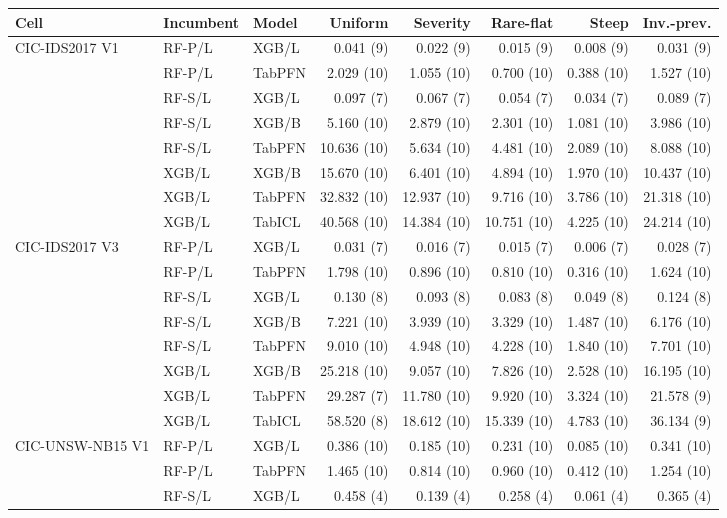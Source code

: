 \begin{tabular}{@{}lllrrrrr@{}}
\toprule
Cell & Incumbent & Model & Uniform & Severity & Rare-flat & Steep & Inv.-prev. \\
\midrule
CIC-IDS2017 V1 & RF-P/L & XGB/L & 0.041 (9) & 0.022 (9) & 0.015 (9) & 0.008 (9) & 0.031 (9) \\
 & RF-P/L & TabPFN & 2.029 (10) & 1.055 (10) & 0.700 (10) & 0.388 (10) & 1.527 (10) \\
 & RF-S/L & XGB/L & 0.097 (7) & 0.067 (7) & 0.054 (7) & 0.034 (7) & 0.089 (7) \\
 & RF-S/L & XGB/B & 5.160 (10) & 2.879 (10) & 2.301 (10) & 1.081 (10) & 3.986 (10) \\
 & RF-S/L & TabPFN & 10.636 (10) & 5.634 (10) & 4.481 (10) & 2.089 (10) & 8.088 (10) \\
 & XGB/L & XGB/B & 15.670 (10) & 6.401 (10) & 4.894 (10) & 1.970 (10) & 10.437 (10) \\
 & XGB/L & TabPFN & 32.832 (10) & 12.937 (10) & 9.716 (10) & 3.786 (10) & 21.318 (10) \\
 & XGB/L & TabICL & 40.568 (10) & 14.384 (10) & 10.751 (10) & 4.225 (10) & 24.214 (10) \\
\addlinespace
CIC-IDS2017 V3 & RF-P/L & XGB/L & 0.031 (7) & 0.016 (7) & 0.015 (7) & 0.006 (7) & 0.028 (7) \\
 & RF-P/L & TabPFN & 1.798 (10) & 0.896 (10) & 0.810 (10) & 0.316 (10) & 1.624 (10) \\
 & RF-S/L & XGB/L & 0.130 (8) & 0.093 (8) & 0.083 (8) & 0.049 (8) & 0.124 (8) \\
 & RF-S/L & XGB/B & 7.221 (10) & 3.939 (10) & 3.329 (10) & 1.487 (10) & 6.176 (10) \\
 & RF-S/L & TabPFN & 9.010 (10) & 4.948 (10) & 4.228 (10) & 1.840 (10) & 7.701 (10) \\
 & XGB/L & XGB/B & 25.218 (10) & 9.057 (10) & 7.826 (10) & 2.528 (10) & 16.195 (10) \\
 & XGB/L & TabPFN & 29.287 (7) & 11.780 (10) & 9.920 (10) & 3.324 (10) & 21.578 (9) \\
 & XGB/L & TabICL & 58.520 (8) & 18.612 (10) & 15.339 (10) & 4.783 (10) & 36.134 (9) \\
\addlinespace
CIC-UNSW-NB15 V1 & RF-P/L & XGB/L & 0.386 (10) & 0.185 (10) & 0.231 (10) & 0.085 (10) & 0.341 (10) \\
 & RF-P/L & TabPFN & 1.465 (10) & 0.814 (10) & 0.960 (10) & 0.412 (10) & 1.254 (10) \\
 & RF-S/L & XGB/L & 0.458 (4) & 0.139 (4) & 0.258 (4) & 0.061 (4) & 0.365 (4) \\

\end{tabular}

